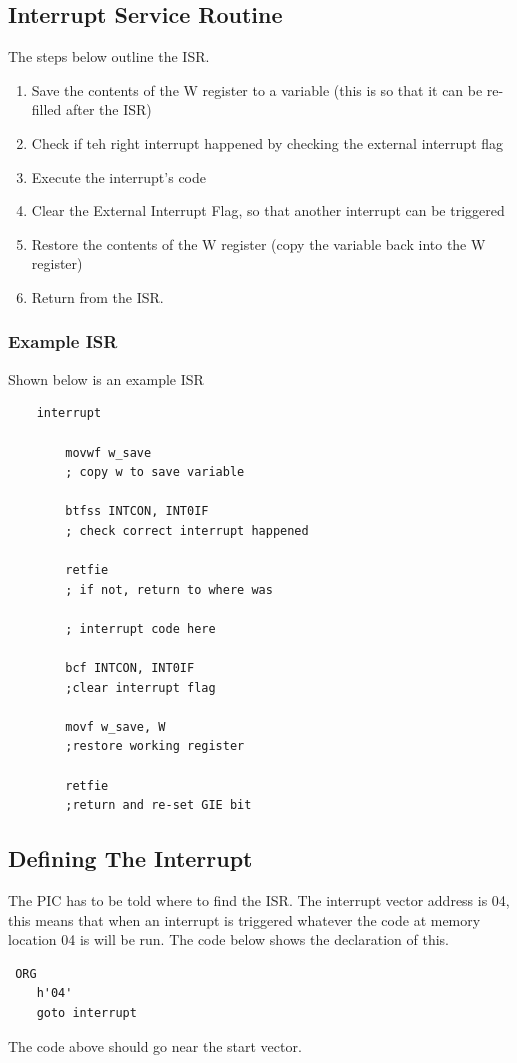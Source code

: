\documentclass[a4paper,11pt, twocolumn]{article}
\begin{document}
\subsection{Interrupt Service Routine}
The steps below outline the ISR.
\begin{enumerate}
    \item Save the contents of the W register to a variable (this is so that it can be re-filled after the ISR)
    \item Check if teh right interrupt happened by checking the external interrupt flag
    \item Execute the interrupt's code
    \item Clear the External Interrupt Flag, so that another interrupt can be triggered
    \item Restore the contents of the W register (copy the variable back into the W register)
    \item Return from the ISR.
\end{enumerate}
\subsubsection{Example ISR}
Shown below is an example ISR
\begin{verbatim}
    interrupt

        movwf w_save 
        ; copy w to save variable
        
        btfss INTCON, INT0IF
        ; check correct interrupt happened
        
        retfie
        ; if not, return to where was
        
        ; interrupt code here
        
        bcf INTCON, INT0IF
        ;clear interrupt flag
        
        movf w_save, W
        ;restore working register
        
        retfie
        ;return and re-set GIE bit

\end{verbatim}
\subsection{Defining The Interrupt}
The PIC has to be told where to find the ISR. The interrupt vector address is 04, this means that when an interrupt is triggered whatever the code at memory location 04 is will be run. The code below shows the declaration of this.
\begin{verbatim}
 ORG
    h'04'
    goto interrupt
\end{verbatim}
The code above should go near the start vector.
\end{document}
